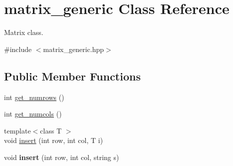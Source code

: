 \hypertarget{classmatrix__generic}{\section{matrix\-\_\-generic Class Reference}
\label{classmatrix__generic}
}


Matrix class.  




{\ttfamily \#include $<$matrix\-\_\-generic.\-hpp$>$}

\subsection*{Public Member Functions}
\begin{DoxyCompactItemize}
\item 
int \hyperlink{classmatrix__generic_a3cd0f27466cfca62aaa62d7115edd8bc}{get\-\_\-numrows} ()
\item 
int \hyperlink{classmatrix__generic_a359f8252df6ee6fa207a2881fb13f735}{get\-\_\-numcols} ()
\item 
{\footnotesize template$<$class T $>$ }\\void \hyperlink{classmatrix__generic_a62c778686fc6c1313e176fe6c5a5927a}{insert} (int row, int col, T i)
\item 
\hypertarget{classmatrix__generic_a229d21244d87626b8db145c6a55bc77a}{void {\bfseries insert} (int row, int col, string s)}\label{classmatrix__generic_a229d21244d87626b8db145c6a55bc77a}


\end{DoxyCompactItemize}
